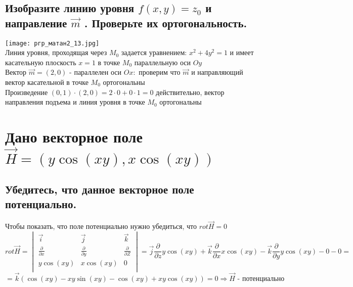 \documentclass{article}
\begin{document}
    \subsection{Изобразите линию уровня $f (x, y) = z_0$ и направление $\overrightarrow{m}$ . Проверьте их ортогональность.}
    \texttt{[image: ргр\_матан2\_13.jpg]} \\
    Линия уровня, проходящая через $M_0$ задается уравнением: $x^2 + 4y^2 = 1$ и имеет касательную плоскость $x = 1$ в точке $M_0$ параллельную оси $Oy$\\
    Вектор $\overrightarrow{m} = (2, 0)$ - параллелен оси $Ox:$ проверим что $\overrightarrow{m}$ и направляющий вектор касательной в точке $M_0$ ортогональны\\
    Произведение $(0, 1) \cdot (2, 0) = 2 \cdot 0 + 0 \cdot 1 = 0$ действительно, вектор направления подъема и линия уровня в точке $M_0$ ортогональны
    

    
\newpage
    \section{Дано векторное поле $\overrightarrow{H} = (y \cos(xy), x \cos (xy))$}
    \subsection{Убедитесь, что данное векторное поле потенциально.}
    Чтобы показать, что поле потенциально нужно убедиться, что $rot \overrightarrow{H}=0$
    \begin{equation*}
        rot \overrightarrow{H} =
        \begin{vmatrix}
            \overrightarrow{i} & \overrightarrow{j} & \overrightarrow{k}\\
            \frac{\partial}{\partial x} & \frac{\partial}{\partial y} & \frac{\partial}{\partial Z}\\
            y\cos(xy) & x\cos(xy) & 0\\
        \end{vmatrix}
        = \overrightarrow{j} \frac{\partial}{\partial z} y \cos(xy) + \overrightarrow{k} \frac{\partial}{\partial x} x \cos (xy) - \overrightarrow{k} \frac{\partial}{\partial y} y \cos (xy) - 0 - 0 =
    \end{equation*}
    \begin{equation*}
        = \overrightarrow{k} (\cos(xy) - xy \sin(xy) - \cos(xy) + xy \cos(xy)) = 0 \Rightarrow \overrightarrow{H} \text{ - потенциально}
    \end{equation*}
    
\end{document}
